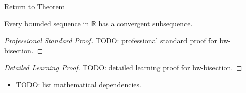 \newpage
{}
\label{prf:bw-bisection}

\begin{remark*}[Return]
\hyperref[prop:bw-bisection]{Return to Theorem}
\end{remark*}

\begin{theorem*}
Every bounded sequence in $\mathbb{R}$ has a convergent subsequence.
\end{theorem*}

\begin{proof}[Professional Standard Proof]
\LRAProofBodyStart
TODO: professional standard proof for bw-bisection.
\end{proof}

\begin{proof}[Detailed Learning Proof]
\LRAProofBodyStart
TODO: detailed learning proof for bw-bisection.
\end{proof}

\begin{remark*}
\end{remark*}

\begin{dependencies}
\begin{itemize}
  \item TODO: list mathematical dependencies.
\end{itemize}
\end{dependencies}

\clearpage
